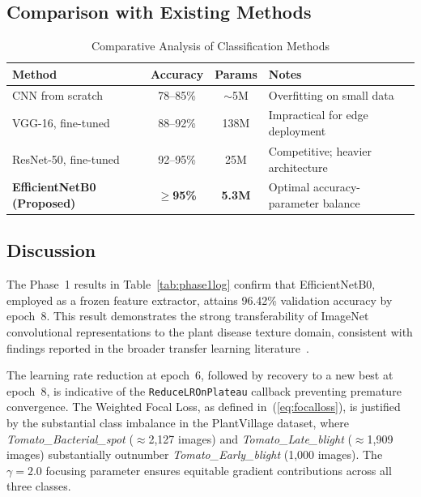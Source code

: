 \documentclass[12pt, a4paper, onecolumn]{IEEEtran}
\begin{document}
\subsection{Comparison with Existing Methods}

\begin{table}[H]
  \centering
  \caption{Comparative Analysis of Classification Methods}
  \label{tab:comparison}
  \begin{tabularx}{\linewidth}{lccX}
    \toprule
    \textbf{Method}                    & \textbf{Accuracy}  & \textbf{Params} & \textbf{Notes} \\
    \midrule
    CNN from scratch                   & 78--85\%    & $\sim$5M   & Overfitting on small data \\
    VGG-16, fine-tuned                 & 88--92\%    & 138M       & Impractical for edge deployment \\
    ResNet-50, fine-tuned              & 92--95\%    & 25M        & Competitive; heavier architecture \\
    \textbf{EfficientNetB0 (Proposed)} & $\geq$\textbf{95\%} & \textbf{5.3M} & Optimal accuracy-parameter balance \\
    \bottomrule
  \end{tabularx}
\end{table}

\subsection{Discussion}

The Phase~1 results in Table~\ref{tab:phase1log} confirm that EfficientNetB0, employed as a frozen
feature extractor, attains 96.42\% validation accuracy by epoch~8. This result demonstrates the
strong transferability of ImageNet convolutional representations to the plant disease texture domain,
consistent with findings reported in the broader transfer learning literature~\cite{pan2010}.

The learning rate reduction at epoch~6, followed by recovery to a new best at epoch~8, is indicative
of the \texttt{ReduceLROnPlateau} callback preventing premature convergence. The Weighted Focal Loss,
as defined in~(\ref{eq:focalloss}), is justified by the substantial class imbalance in the
PlantVillage dataset, where \textit{Tomato\_Bacterial\_spot} ($\approx$2,127 images) and
\textit{Tomato\_Late\_blight} ($\approx$1,909 images) substantially outnumber
\textit{Tomato\_Early\_blight} (1,000 images). The $\gamma=2.0$ focusing parameter ensures equitable
gradient contributions across all three classes.
\end{document}
